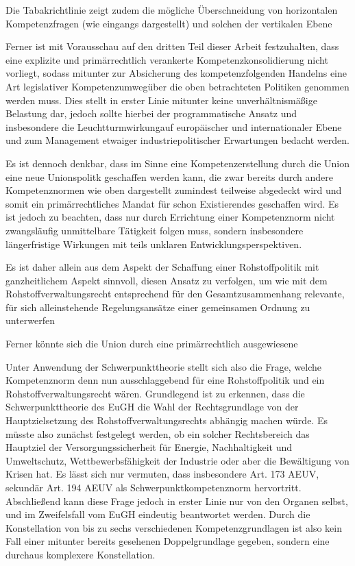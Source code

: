 \documentclass[12pt,a4paper,oneside]{book} %
\begin{document}
	Die Tabakrichtlinie zeigt zudem die mögliche Überschneidung von horizontalen Kompetenzfragen (wie eingangs dargestellt) und solchen der vertikalen Ebene
	
	Ferner ist mit Vorausschau auf den dritten Teil dieser Arbeit festzuhalten, dass eine explizite und primärrechtlich verankerte Kompetenzkonsolidierung nicht vorliegt, sodass mitunter zur Absicherung des kompetenzfolgenden Handelns eine Art legislativer \glqq Kompetenzumweg\grqq über die oben betrachteten Politiken genommen werden muss. Dies stellt in erster Linie mitunter keine unverhältnismäßige Belastung dar, jedoch sollte hierbei der programmatische Ansatz und insbesondere die \glqq Leuchtturmwirkung\grqq auf europäischer und internationaler Ebene und zum Management etwaiger industriepolitischer Erwartungen bedacht werden.
	
	Es ist dennoch denkbar, dass im Sinne eine Kompetenzerstellung durch die Union eine neue Unionspolitk geschaffen werden kann, die zwar bereits durch andere Kompetenznormen wie oben dargestellt zumindest teilweise abgedeckt wird und somit ein primärrechtliches Mandat für schon Existierendes geschaffen wird. Es ist jedoch zu beachten, dass nur durch Errichtung einer Kompetenznorm nicht zwangsläufig unmittelbare Tätigkeit folgen muss, sondern insbesondere längerfristige Wirkungen mit teils unklaren Entwicklungsperspektiven.\autocite[siehe hierzu Nettesheim Art. 194 En 40]{grabitz_recht_2024}
	
	Es ist daher allein aus dem Aspekt der Schaffung einer Rohstoffpolitik mit ganzheitlichem Aspekt sinnvoll, diesen Ansatz zu verfolgen, um wie mit dem Rohstoffverwaltungsrecht entsprechend für den Gesamtzusammenhang relevante, für sich alleinstehende Regelungsansätze einer gemeinsamen Ordnung zu unterwerfen
	
	Ferner könnte sich die Union durch eine primärrechtlich ausgewiesene
	
	Unter Anwendung der Schwerpunkttheorie stellt sich also die Frage, welche Kompetenznorm denn nun ausschlaggebend für eine Rohstoffpolitik und ein Rohstoffverwaltungsrecht wären. Grundlegend ist zu erkennen, dass die Schwerpunkttheorie des EuGH die Wahl der Rechtsgrundlage von der Hauptzielsetzung des Rohstoffverwaltungsrechts abhängig machen würde. Es müsste also zunächst festgelegt werden, ob ein solcher Rechtsbereich das Hauptziel der Versorgungssicherheit für Energie, Nachhaltigkeit und Umweltschutz, Wettbewerbsfähigkeit der Industrie oder aber die Bewältigung von Krisen hat. Es lässt sich nur vermuten, dass insbesondere Art. 173 AEUV, sekundär Art. 194 AEUV als Schwerpunktkompetenznorm hervortritt. Abschließend kann diese Frage jedoch in erster Linie nur von den Organen selbst, und im Zweifelsfall vom EuGH eindeutig beantwortet werden. Durch die Konstellation von bis zu sechs verschiedenen Kompetenzgrundlagen ist also kein Fall einer mitunter bereits gesehenen Doppelgrundlage gegeben, sondern eine durchaus komplexere Konstellation. 
	
\end{document}
